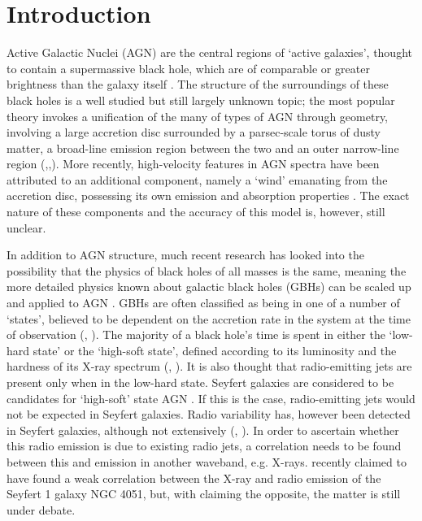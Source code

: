 \documentclass[letters,useAMS,usenatbib]{samnote}
\begin{document}
\newpage
\tableofcontents
\newpage

 
\section{Introduction}


Active Galactic Nuclei (AGN) are the central regions of `active galaxies', thought to contain a supermassive black hole, which are of comparable or greater brightness
than the galaxy itself \citep{krolik}. The structure of the surroundings of these black holes is a well studied but still largely unknown topic; the most popular
theory invokes a unification of the many of types of AGN through geometry, involving a large accretion disc surrounded by a parsec-scale torus of dusty matter, a
broad-line emission region between the two and an outer narrow-line region (\citet{krolik88},\citet{bianchi12},\citet{urry95}). More recently, high-velocity features in
AGN spectra have been attributed to an additional component, namely a `wind' emanating from the accretion disc, possessing its own emission and absorption properties
\citep{elvis}. The exact nature of these components and the accuracy of this model is, however, still unclear.

In addition to AGN structure, much recent research has looked into the possibility that the physics of black holes of all masses is the same, meaning the more detailed
physics known about galactic black holes (GBHs) can be scaled up and applied to AGN \citep{mchardy06}. GBHs are often classified as being in one of a number of
`states', believed to be dependent on the accretion rate in the system at the time of observation (\citet{mcclintock06}, \citet{fender04}). The
majority of a black hole's time is spent in either the `low-hard state' or the `high-soft state', defined according to its luminosity and the hardness of its X-ray
spectrum (\citet{jones11}, \citet{belloni10}). It is also thought that radio-emitting jets are present only when in the low-hard state. Seyfert galaxies are considered to
be candidates for `high-soft' state AGN \citep{mchardy04}. If this is the case, radio-emitting jets would not be expected in Seyfert galaxies. Radio variability has,
however been detected in Seyfert galaxies, although not extensively (\citet{neff83}, \citet{mundell09}). In order to ascertain whether this radio emission is due to
existing radio jets, a correlation needs to be found between this and emission in another waveband, e.g. X-rays. \citet{king13} recently claimed to have found a weak
correlation between the X-ray and radio emission of the Seyfert 1 galaxy NGC 4051, but, with \citet{jones11} claiming the opposite, the matter is still under debate.
\end{document}
